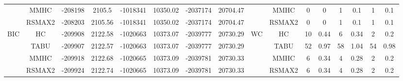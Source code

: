 \begin{table}[p]
{\begin{tabular}{cc||cc|cc|cc||cc|cc|cc|cc}
& MMHC &	-208198 & 	2105.5 & 	-1018341 & 	10350.02 & 	-2037174 & 	20704.47 & 	& MMHC &	0 & 	0 & 	1 & 	0.1 & 	1 & 	0.1\tabularnewline													
& RSMAX2 &	-208203 & 	2105.56 & 	-1018341 & 	10350.02 & 	-2037174 & 	20704.47 & 	& RSMAX2 &	0 & 	0 & 	1 & 	0.1 & 	1 & 	0.1\tabularnewline													
\hline																										
\multirow{4}{*}{BIC} & HC &	-209908 & 	2122.58 & 	-1020663 & 	10373.07 & 	-2039777 & 	20730.29 & 	\multirow{4}{*}{WC} & HC &	10 & 	0.44 & 	6 & 	0.34 & 	2 & 	0.2\tabularnewline													
& TABU &	-209907 & 	2122.57 & 	-1020663 & 	10373.07 & 	-2039777 & 	20730.29 & 	& TABU &	52 & 	0.97 & 	58 & 	1.04 & 	54 & 	0.98\tabularnewline													
& MMHC &	-209918 & 	2122.68 & 	-1020665 & 	10373.09 & 	-2039781 & 	20730.33 & 	& MMHC &	6 & 	0.34 & 	4 & 	0.28 & 	2 & 	0.2\tabularnewline													
& RSMAX2 &	-209924 & 	2122.74 & 	-1020665 & 	10373.09 & 	-2039781 & 	20730.33 & 	& RSMAX2 &	6 & 	0.34 & 	4 & 	0.28 & 	2 & 	0.2\tabularnewline													
\hline																										
\end{tabular}																										
}																										
\end{table}																										


